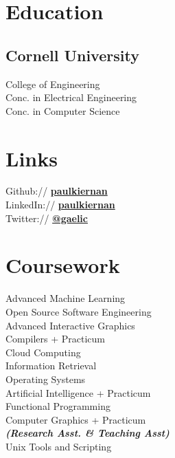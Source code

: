 \documentclass[]{deedy-resume-openfont}
\begin{document}
\lastupdated
{}

\begin{minipage}[t]{0.33\textwidth}

    \section{Education}
        \subsection{Cornell University}
            College of Engineering \\
            Conc. in Electrical Engineering \\
            Conc. in Computer Science\\
    \sectionsep

    \section{Links}
        Github:// \href{https://github.com/paulkiernan}{\bf paulkiernan} \\
        LinkedIn://  \href{https://www.linkedin.com/pub/paul-kiernan/24/a32/470}{\bf paulkiernan} \\
        Twitter://  \href{https://twitter.com/gaelic}{\bf @gaelic} \\
    \sectionsep

    \section{Coursework}
        Advanced Machine Learning \\
        Open Source Software Engineering \\
        Advanced Interactive Graphics \\
        Compilers + Practicum \\
        Cloud Computing \\
        Information Retrieval \\
        Operating Systems \\
        Artificial Intelligence + Practicum \\
        Functional Programming \\
        Computer Graphics + Practicum \\
        {\footnotesize \textit{\textbf{(Research Asst. \& Teaching Asst) }}} \\
        Unix Tools and Scripting \\
    \sectionsep


\end{minipage}
\end{document}
